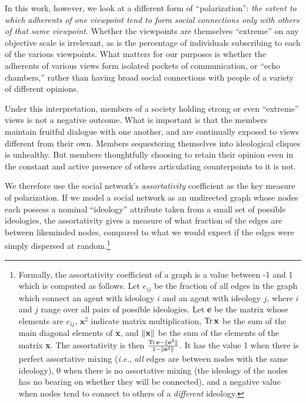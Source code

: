 In this work, however, we look at a different form of ``polarization'':
\textit{the extent to which adherents of one viewpoint tend to form social
connections only with others of that same viewpoint.} Whether the viewpoints
are themselves ``extreme'' on any objective scale is irrelevant, as is the
percentage of individuals subscribing to each of the various viewpoints. What
matters for our purposes is whether the adherents of various views form
isolated pockets of communication, or ``echo chambers,'' rather than having
broad social connections with people of a variety of different opinions.

Under this interpretation, members of a society holding strong or even
``extreme'' views is not a negative outcome. What is important is that the
members maintain fruitful dialogue with one another, and are continually
exposed to views different from their own. Members sequestering themselves
into ideological cliques is unhealthy. But members thoughtfully choosing
to retain their opinion even in the constant and active presence of others
articulating counterpoints to it is not.

We therefore use the social network's \textit{assortativity}
coefficient\cite{newman_mixing_2003} as the key measure of polarization. If we
model a social network as an undirected graph whose nodes each possess a
nominal ``ideology'' attribute taken from a small set of possible ideologies,
the assortativity gives a measure of what fraction of the edges are between
likeminded nodes, compared to what we would expect if the edges were simply
dispersed at random.\footnote{Formally, the assortativity coefficient of a
graph is a value between -1 and 1 which is computed as follows. Let $e_{ij}$
be the fraction of all edges in the graph which connect an agent with ideology
$i$ and an agent with ideology $j$, where $i$ and $j$ range over all pairs of
possible ideologies. Let \textbf{e} be the matrix whose elements are $e_{ij}$,
$\textbf{x}^2$ indicate matrix multiplication, $\operatorname{Tr} \textbf{x}$ be the sum of
the main diagonal elements of \textbf{x}, and $\lVert\textbf{x}\rVert$ be the sum
of the elements of the matrix \textbf{x}. The assortativity is then $\frac{\operatorname{Tr}
\textbf{e} - \lVert\textbf{e}^2\rVert}{1 - \lVert\textbf{e}^2\rVert}$. It has the value
1 when there is perfect assortative mixing (\textit{i.e.}, \textit{all} edges
are between nodes with the same ideology), 0 when there is no assortative
mixing (the ideology of the nodes has no bearing on whether they will be
connected), and a negative value when nodes tend to connect to others of a
\textit{different} ideology.}


